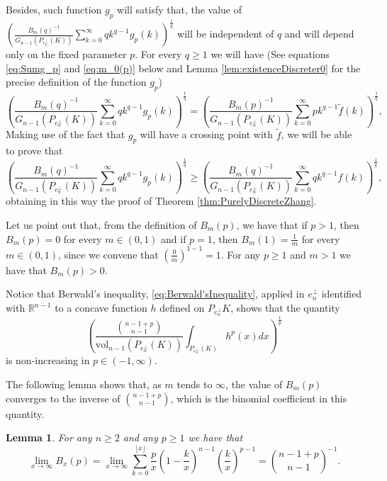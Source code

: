 \documentclass[10pt]{amsart}
\newtheorem{lemma}[thm]{Lemma}
\def\R{\mathbb{R}}
\def\vol{\mathrm{vol}}
\numberwithin{equation}{section}
\begin{document}
Besides, such function $g_p$ will satisfy that, the value of $\displaystyle{\left(\frac{B_{m}(q)^{-1}}{G_{n-1}(P_{e_n^\perp}(K))}\sum_{k=0}^\infty qk^{q-1}g_p(k)\right)^\frac{1}{q}}$ will be independent of $q$ and will depend only on the fixed parameter $p$. For every $q\geq1$  we will have (See equations \eqref{eq:Sumg_p} and \eqref{eq:m_0(p)} below and Lemma \ref{lem:existenceDiscreter0} for the precise definition of the function $g_p$)
$$
\left(\frac{B_{m}(q)^{-1}}{G_{n-1}(P_{e_n^\perp}(K))}\sum_{k=0}^\infty qk^{q-1}g_p(k)\right)^\frac{1}{q}=\left(\frac{B_{m}(p)^{-1}}{G_{n-1}(P_{e_n^\perp}(K))}\sum_{k=0}^\infty pk^{q-1}\tilde{f}(k)\right)^\frac{1}{q},
$$
Making use of the fact that $g_p$ will have a crossing point with $\tilde{f}$, we will be able to prove that
$$
\left(\frac{B_{m}(q)^{-1}}{G_{n-1}(P_{e_n^\perp}(K))}\sum_{k=0}^\infty qk^{q-1}g_p(k)\right)^\frac{1}{q}\geq\left(\frac{B_{m}(q)^{-1}}{G_{n-1}(P_{e_n^\perp}(K))}\sum_{k=0}^\infty qk^{q-1}f(k)\right)^\frac{1}{q},
$$
obtaining in this way the proof of Theorem \ref{thm:PurelyDiscreteZhang}.


Let us point out that, from the definition of $B_{m}(p)$, we have that if $p>1$, then $B_m(p)=0$ for every $m\in(0,1)$ and if $p=1$, then $B_m(1)=\frac{1}{m}$ for every $m\in(0,1)$, since we convene that $\left(\frac{0}{m}\right)^{1-1}=1$. For any $p\geq 1$ and $m>1$ we have that $B_m(p)>0$.

Notice that Berwald's inequality, \eqref{eq:Berwald'sInequality}, applied in $e_n^\perp$ identified  with $\R^{n-1}$ to a concave function $h$ defined on $P_{e_n^\perp}K$, shows that the quantity $$\left(\frac{{{n-1+p}\choose{n-1}}}{\vol_{n-1}(P_{e_n^\perp}(K))}\int_{P_{e_n^\perp}(K)}h^p(x)dx\right)^\frac{1}{p}$$ is non-increasing in $p\in(-1,\infty)$.

The following lemma shows that, as $m$ tends to $\infty$, the value of $B_{m}(p)$ converges to the inverse of ${{n-1+p}\choose{n-1}}$, which is the binomial coefficient in this quantity.
\begin{lemma}\label{lem:limit}
For any $n\geq2$ and any $p\geq1$ we have that
$$
\lim_{x\to\infty} B_{x}(p)=\lim_{x\to\infty}\sum_{k=0}^{\lfloor x\rfloor}\frac{p}{x}\left(1-\frac{k}{x}\right)^{n-1}\left(\frac{k}{x}\right)^{p-1}={{n-1+p}\choose{n-1}}^{-1}.
$$
\end{lemma}
\end{document}
